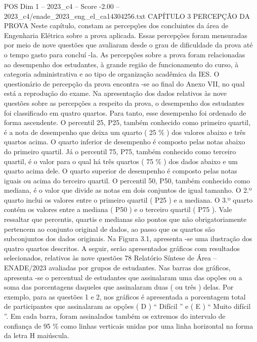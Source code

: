 \begin{textsample}{POS Dim 1 – 2023\_c4 – Score -2.00 – 2023\_c4/enade\_2023\_eng\_el\_ca14304256.txt}  \label{ex:f1_pos_191}
CAPÍTULO 3 PERCEPÇÃO DA PROVA Neste capítulo, constam as percepções dos concluintes da área de Engenharia Elétrica sobre a prova aplicada.
Essas percepções foram mensuradas por meio de nove questões que avaliaram desde o grau de dificuldade da prova até o tempo gasto para concluí -la.
As percepções sobre a prova foram relacionadas ao desempenho dos estudantes, à grande região de funcionamento do curso, à categoria administrativa e ao tipo de organização acadêmica da IES.
O questionário de percepção da prova encontra -se ao final do Anexo VII, no qual está a reprodução do exame.
Na apresentação dos dados relativos às nove questões sobre as percepções a respeito da prova, o desempenho dos estudantes foi classificado em quatro quartos.
Para tanto, esse desempenho foi ordenado de forma ascendente.
O percentil 25, P25, também conhecido como primeiro quartil, é a nota de desempenho que deixa um quarto ( 25 \% ) dos valores abaixo e três quartos acima.
O quarto inferior de desempenho é composto pelas notas abaixo do primeiro quartil.
Já o percentil 75, P75, também conhecido como terceiro quartil, é o valor para o qual há três quartos ( 75 \% ) dos dados abaixo e um quarto acima dele.
O quarto superior de desempenho é composto pelas notas iguais ou acima do terceiro quartil.
O percentil 50, P50, também conhecido como mediana, é o valor que divide as notas em dois conjuntos de igual tamanho.
O 2.º quarto inclui os valores entre o primeiro quartil ( P25 ) e a mediana.
O 3.º quarto contém os valores entre a mediana ( P50 ) e o terceiro quartil ( P75 ).
Vale ressaltar que percentis, quartis e medianas são pontos que não obrigatoriamente pertencem ao conjunto original de dados, ao passo que os quartos são subconjuntos dos dados originais.
Na Figura 3.1, apresenta -se uma ilustração dos quatro quartos descritos.
A seguir, serão apresentados gráficos com resultados selecionados, relativos às nove questões 78 Relatório Síntese de Área – ENADE/2023 avaliadas por grupos de estudantes.
Nas barras dos gráficos, apresenta -se o percentual de estudantes que assinalaram uma das opções ou a soma das porcentagens daqueles que assinalaram duas ( ou três ) delas.
Por exemplo, para as questões 1 e 2, nos gráficos é apresentada a porcentagem total de participantes que assinalaram as opções ( D ) “ Difícil ” e ( E ) “ Muito difícil ”.
Em cada barra, foram assinalados também os extremos do intervalo de confiança de 95 \% como linhas verticais unidas por uma linha horizontal na forma da letra H maiúscula.

\end{textsample}
